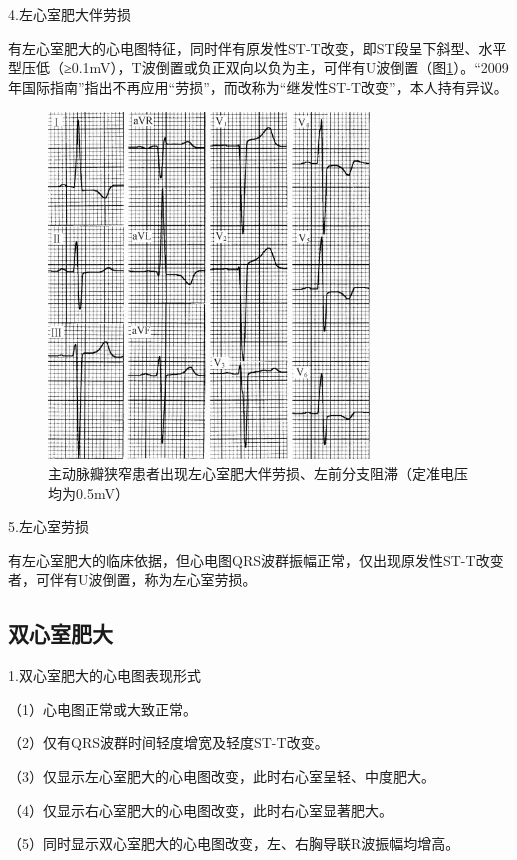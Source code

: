 4.左心室肥大伴劳损

有左心室肥大的心电图特征，同时伴有原发性ST-T改变，即ST段呈下斜型、水平型压低（≥0.1mV），T波倒置或负正双向以负为主，可伴有U波倒置（图\ref{fig3-4}）。“2009年国际指南”指出不再应用“劳损”，而改称为“继发性ST-T改变”，本人持有异议。

\begin{figure}[!htbp]
 \centering
 \includegraphics[width=3.35417in,height=3.625in]{./images/Image00053.jpg}
 \captionsetup{justification=centering}
 \caption{主动脉瓣狭窄患者出现左心室肥大伴劳损、左前分支阻滞（定准电压均为0.5mV）}
 \label{fig3-4}
  \end{figure} 

5.左心室劳损

有左心室肥大的临床依据，但心电图QRS波群振幅正常，仅出现原发性ST-T改变者，可伴有U波倒置，称为左心室劳损。

\protect\hypertarget{text00009.htmlux5cux23subid43}{}{}

\subsection{双心室肥大}

1.双心室肥大的心电图表现形式

（1）心电图正常或大致正常。

（2）仅有QRS波群时间轻度增宽及轻度ST-T改变。

（3）仅显示左心室肥大的心电图改变，此时右心室呈轻、中度肥大。

（4）仅显示右心室肥大的心电图改变，此时右心室显著肥大。

（5）同时显示双心室肥大的心电图改变，左、右胸导联R波振幅均增高。

